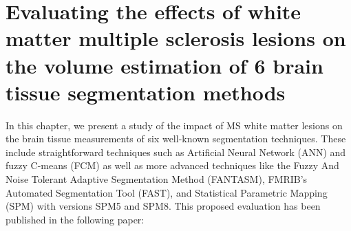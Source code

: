 
\chapter{Evaluating the effects of white matter multiple sclerosis lesions on the volume estimation of 6 brain tissue segmentation
methods}  
\label{chapter:chapter_3}
In this chapter, we present a study of the impact of MS white matter lesions on the brain tissue measurements of six well-known segmentation techniques. These include straightforward techniques such as Artificial Neural Network (ANN) and fuzzy C-means (FCM) as well as more advanced techniques like the Fuzzy And Noise Tolerant Adaptive Segmentation Method (FANTASM), FMRIB's Automated Segmentation Tool (FAST), and Statistical Parametric Mapping (SPM) with versions SPM5 and SPM8. This proposed evaluation has been published in the following paper:

\vspace{2cm}

\noindent{}





